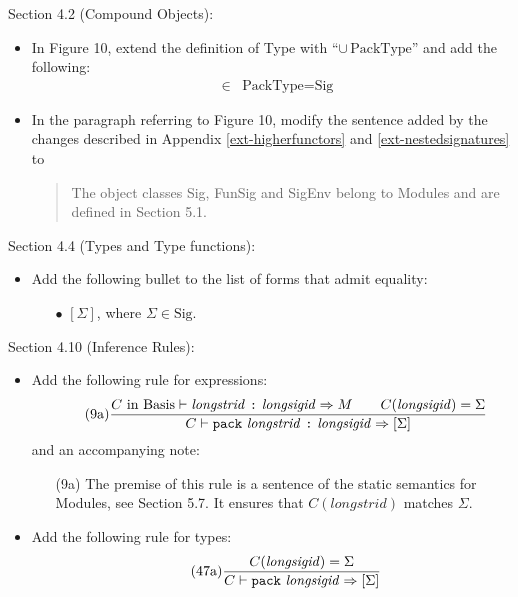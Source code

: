 \documentclass[twoside,titlepage]{article}
\begin{document}
\begin{appendix}
Section 4.2 (Compound Objects):
\begin{itemize}
\item In Figure 10, extend the definition of Type with ``$\cup\,\mbox{PackType}$'' and add the following:
  \begin{eqnarray*}
  [\Sigma] &\in& \mbox{PackType} = \mbox{Sig}
  \end{eqnarray*}

\item In the paragraph referring to Figure 10, modify the sentence added by the changes described in Appendix \ref{ext-higherfunctors} and \ref{ext-nestedsignatures} to
  \begin{quote}
  The object classes Sig, FunSig and SigEnv belong to Modules and are defined in Section 5.1.
  \end{quote}
\end{itemize}

Section 4.4 (Types and Type functions):
\begin{itemize}
\item Add the following bullet to the list of forms that admit equality:
  \begin{itemize}
  \item[$\bullet$] $[\Sigma]$, where $\Sigma \in \mbox{Sig}$.
  \end{itemize}
\end{itemize}

Section 4.10 (Inference Rules):
\begin{itemize}
\item Add the following rule for expressions:
  \begin{equation}
  \tag{9a}
  \frac{
  \mbox{$C$ in Basis} \vdash \mathit{longstrid}~\mbox{\tt:}~\mathit{longsigid} \Rightarrow M
  \qquad
  C(\mathit{longsigid}) = \Sigma
  }{
  C \vdash {\tt{pack}}~\mathit{longstrid}~\mbox{\tt:}~\mathit{longsigid} \Rightarrow [\Sigma]
  }
  \end{equation}
  and an accompanying note:
  \begin{enumerate}
  \item[(9a)] The premise of this rule is a sentence of the static semantics for Modules, see Section 5.7. It ensures that $C(\mathit{longstrid})$ matches $\Sigma$.
  \end{enumerate}

\item Add the following rule for types:
  \begin{equation}
  \tag{47a}
  \frac{
  C(\mathit{longsigid}) = \Sigma
  }{
  C \vdash {\tt{pack}}~\mathit{longsigid} \Rightarrow [\Sigma]
  }
  \end{equation}
\end{itemize}


\end{appendix}
\end{document}
